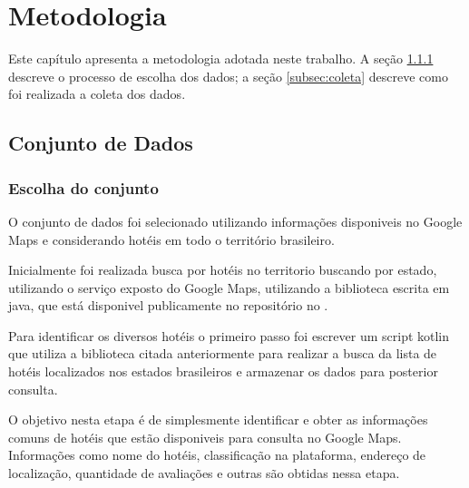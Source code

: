 \chapter{Metodologia}
\label{cap:metodologia}

Este capítulo apresenta a metodologia adotada neste trabalho. A seção \ref{subsec:escolha_conjunto} descreve o processo de escolha dos dados; a seção \ref{subsec:coleta} descreve como foi realizada a coleta dos dados.


\section{Conjunto de Dados}


\subsection{Escolha do conjunto}
\label{subsec:escolha_conjunto}

O conjunto de dados foi selecionado utilizando informações disponiveis no Google Maps e considerando hotéis em todo o território brasileiro.

Inicialmente foi realizada busca por hotéis no territorio buscando por estado, utilizando o serviço exposto do Google Maps, utilizando a biblioteca escrita em java,  que está disponivel publicamente no repositório no .

Para identificar os diversos hotéis o primeiro passo foi escrever um script kotlin  que utiliza a biblioteca citada anteriormente para realizar a busca da lista de hotéis localizados nos estados brasileiros e armazenar os dados para posterior consulta.

O objetivo nesta etapa é de simplesmente identificar e obter as informações comuns de hotéis que estão disponiveis para consulta no Google Maps. Informações como nome do hotéis, classificação na plataforma, endereço de localização, quantidade de avaliações e outras são obtidas nessa etapa.






